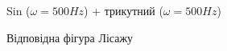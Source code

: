 \begin{figure}[h]
	\begin{minipage}[h]{0.47\linewidth}
		 Sin ($\omega=500 Hz$) + трикутний ($\omega=500 Hz$) \\
	\end{minipage}
	\hfill
	\begin{minipage}[h]{0.47\linewidth}
		 Відповідна фігура Лісажу \\

\end{minipage}
\end{figure}
